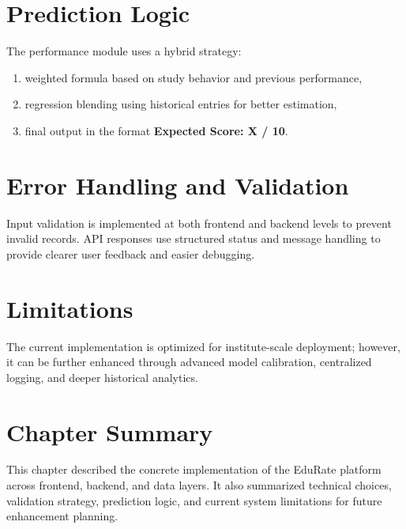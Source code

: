 \section{Prediction Logic}
The performance module uses a hybrid strategy:
\begin{enumerate}[label=\Alph*., leftmargin=1.5em]
    \item weighted formula based on study behavior and previous performance,
    \item regression blending using historical entries for better estimation,
    \item final output in the format \textbf{Expected Score: X / 10}.
\end{enumerate}

\section{Error Handling and Validation}
Input validation is implemented at both frontend and backend levels to prevent invalid records. API responses use structured status and message handling to provide clearer user feedback and easier debugging.

\section{Limitations}
The current implementation is optimized for institute-scale deployment; however, it can be further enhanced through advanced model calibration, centralized logging, and deeper historical analytics.

\section*{Chapter Summary}
This chapter described the concrete implementation of the EduRate platform across frontend, backend, and data layers. It also summarized technical choices, validation strategy, prediction logic, and current system limitations for future enhancement planning.
